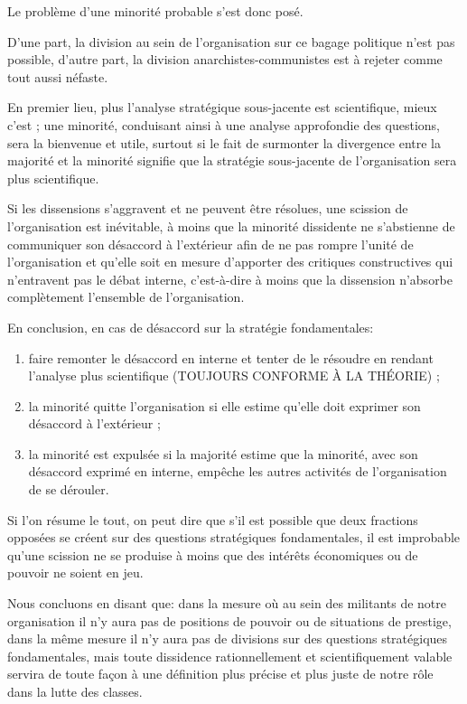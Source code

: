 Le problème d'une minorité probable s'est donc posé.

D'une part, la division au sein de l'organisation sur ce bagage politique n'est pas possible, d'autre part, la division anarchistes-communistes est à rejeter comme tout aussi néfaste.

En premier lieu, plus l'analyse stratégique sous-jacente est scientifique, mieux c'est ; une minorité, conduisant ainsi à une analyse approfondie des questions, sera la bienvenue et utile, surtout si le fait de surmonter la divergence entre la majorité et la minorité signifie que la stratégie sous-jacente de l'organisation sera plus scientifique.

Si les dissensions s'aggravent et ne peuvent être résolues, une scission de l'organisation est inévitable, à moins que la minorité dissidente ne s'abstienne de communiquer son désaccord à l'extérieur afin de ne pas rompre l'unité de l'organisation et qu'elle soit en mesure d'apporter des critiques constructives qui n'entravent pas le débat interne, c'est-à-dire à moins que la dissension n'absorbe complètement l'ensemble de l'organisation.

En conclusion, en cas de désaccord sur la stratégie fondamentales:

\begin{enumerate}
\item{} faire remonter le désaccord en interne et tenter de le résoudre en rendant l'analyse plus scientifique (TOUJOURS CONFORME À LA THÉORIE) ;
\item{} la minorité quitte l’organisation si elle estime qu'elle doit exprimer son désaccord à l'extérieur ;
\item{} la minorité est expulsée si la majorité estime que la minorité, avec son désaccord exprimé en interne, empêche les autres activités de l'organisation de se dérouler.
\end{enumerate}

Si l'on résume le tout, on peut dire que s'il est possible que deux fractions opposées se créent sur des questions stratégiques fondamentales, il est improbable qu'une scission ne se produise à moins que des intérêts économiques ou de pouvoir ne soient en jeu.

Nous concluons en disant que: dans la mesure où au sein des militants de notre organisation il n'y aura pas de positions de pouvoir ou de situations de prestige, dans la même mesure il n'y aura pas de divisions sur des questions stratégiques fondamentales, mais toute dissidence rationnellement et scientifiquement valable servira de toute façon à une définition plus précise et plus juste de notre rôle dans la lutte des classes.

